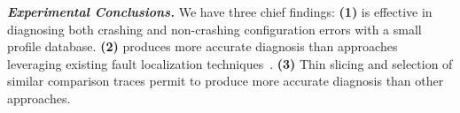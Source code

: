 

\vspace{1mm}

\noindent \textbf{\textit{Experimental Conclusions.}} 
We have three chief findings: \textbf{(1)} \ourtool is effective
in diagnosing both crashing and non-crashing configuration errors
with a small profile database.
\textbf{(2)} \ourtool produces more accurate diagnosis than
approaches leveraging existing fault localization
techniques~\cite{Jones:2002, McCamant:2003}. \textbf{(3)} Thin slicing
and selection of similar comparison traces
permit \ourtool to produce more accurate diagnosis than other approaches.






